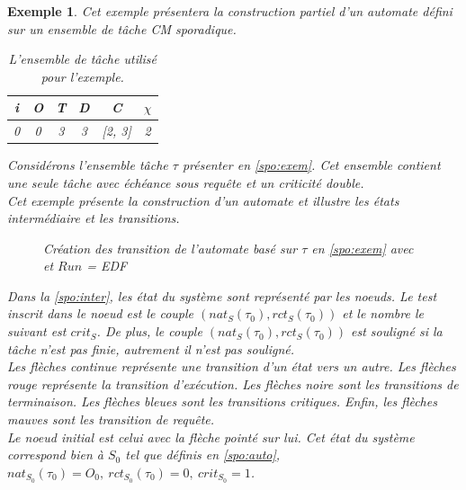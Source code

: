 \documentclass[12pt,a4paper,oneside]{book}
\theoremstyle{break}
\newtheorem{exem}{Exemple}[chapter]
\theoremstyle{breakplain}
\begin{document}
\begin{exem}
Cet exemple présentera la construction partiel d'un automate défini sur un ensemble de tâche CM sporadique.

\begin{table}[h]

    \centering

\begin{tabular}{|c|c|c|c|c|c|}
\hline
i &O & T & D & C & $\chi$\\
\hline
0 & 0 & 3 & 3 & [2, 3]& 2\\
\hline
\end{tabular}
    
\caption{L'ensemble de tâche utilisé pour l'exemple.}
\label{spo:exem}

\end{table}

Considérons l'ensemble tâche $\tau$ présenter en \autoref{spo:exem}. Cet ensemble contient une seule tâche avec échéance sous requête et un criticité double.\\

Cet exemple présente la construction d'un automate et illustre les états intermédiaire et les transitions.

\begin{figure}[h]

    \centering
    \def\svgwidth{\columnwidth}
    
    
\caption{Création des transition de l'automate basé sur $\tau$ en \autoref{spo:exem} avec et $Run$ = EDF}
\label{spo:inter}

\end{figure}


Dans la \autoref{spo:inter}, les état du système sont représenté par les noeuds. Le test inscrit dans le noeud est le couple $(nat_S(\tau_0), rct_S(\tau_0))$ et le nombre le suivant est $crit_S$. De plus, le couple $(nat_S(\tau_0), rct_S(\tau_0))$ est souligné si la tâche n'est pas finie, autrement il n'est pas souligné.\\
Les flèches continue représente une transition d'un état vers un autre. Les flèches rouge représente la transition d'exécution. Les flèches noire sont les transitions de terminaison. Les flèches bleues sont les transitions critiques. Enfin, les flèches mauves sont les transition de requête.\\

Le noeud initial est celui avec la flèche pointé sur lui. Cet état du système correspond bien à $S_0$ tel que définis en \autoref{spo:auto}, $nat_{S_0}(\tau_0) = O_0,\ rct_{S_0}(\tau_0) = 0,\ crit_{S_0} = 1$.\\


\end{exem}
\end{document}
